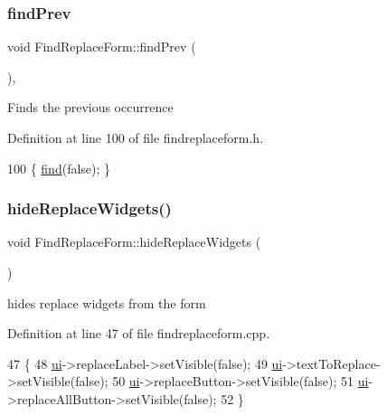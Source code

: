 \subsubsection{\texorpdfstring{find\+Prev}{findPrev}}
{\footnotesize\ttfamily void Find\+Replace\+Form\+::find\+Prev (\begin{DoxyParamCaption}{ }\end{DoxyParamCaption})\hspace{0.3cm}{\ttfamily [inline]}, {\ttfamily [slot]}}

Finds the previous occurrence 

Definition at line 100 of file findreplaceform.\+h.


\begin{DoxyCode}
100 \{ \hyperlink{class_find_replace_form_ad2f83207e2b70f30680049286033915b}{find}(\textcolor{keyword}{false}); \}
\end{DoxyCode}
\mbox{\label{class_find_replace_form_acd7c42b7ef674ca414d0e47158fdad31}} 
\subsubsection{\texorpdfstring{hide\+Replace\+Widgets()}{hideReplaceWidgets()}}
{\footnotesize\ttfamily void Find\+Replace\+Form\+::hide\+Replace\+Widgets (\begin{DoxyParamCaption}{ }\end{DoxyParamCaption})}



hides replace widgets from the form 



Definition at line 47 of file findreplaceform.\+cpp.


\begin{DoxyCode}
47                                          \{
48     \hyperlink{class_find_replace_form_a9bf9e9096feff863dcd6c2a989e07d2c}{ui}->replaceLabel->setVisible(\textcolor{keyword}{false});
49     \hyperlink{class_find_replace_form_a9bf9e9096feff863dcd6c2a989e07d2c}{ui}->textToReplace->setVisible(\textcolor{keyword}{false});
50     \hyperlink{class_find_replace_form_a9bf9e9096feff863dcd6c2a989e07d2c}{ui}->replaceButton->setVisible(\textcolor{keyword}{false});
51     \hyperlink{class_find_replace_form_a9bf9e9096feff863dcd6c2a989e07d2c}{ui}->replaceAllButton->setVisible(\textcolor{keyword}{false});
52 \}
\end{DoxyCode}
\mbox{\label{class_find_replace_form_a87e0f16b427e570ede2a219b16300c2a}} 
